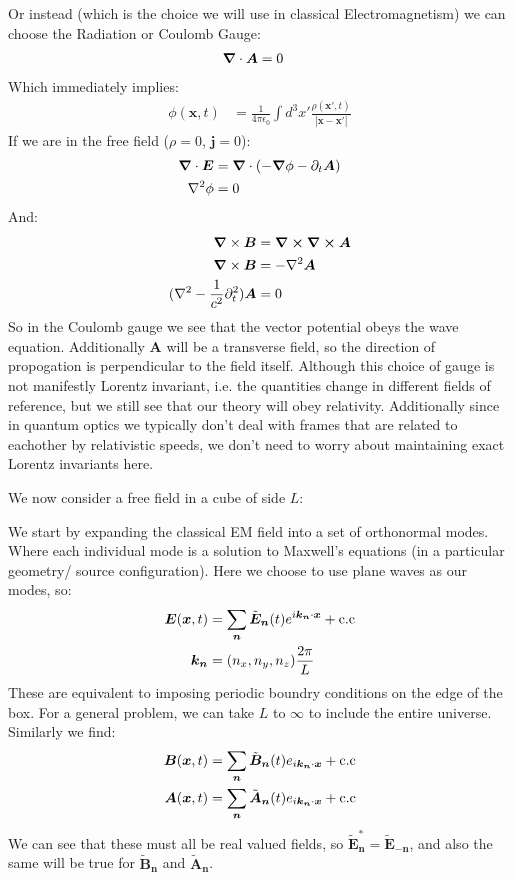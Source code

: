 Or instead (which is the choice we will use in classical Electromagnetism) we can choose the Radiation or Coulomb Gauge:
\begin{align*}
	\bm{\nabla}\cdot\bm{A} &= 0
\end{align*}
Which immediately implies:
\begin{align*}
	\phi(\bm{x},t) &= \frac{1}{4\pi\epsilon_0}\int d^3x' \frac{\rho(\bm{x}',t)}{|\bm{x} - \bm{x'}|}
\end{align*}
If we are in the free field ($\rho = 0$, $\bm{j} = 0$):
\begin{align*}
	\bm{\nabla}\cdot\bm{E} &= \bm{\nabla}\cdot(-\bm{\nabla}\phi - \partial_t\bm{A}) \\
	\nabla^2\phi &= 0
\end{align*}
And:
\begin{align*}
	\bm{\nabla}\times\bm{B} &= \bm{\nabla}\cross\bm{\nabla}\cross\bm{A} \\
	\bm{\nabla}\times\bm{B} &= -\nabla^2\bm{A} \\
	(\nabla^2 -\frac{1}{c^2}\partial_t^2)\bm{A} &= 0
\end{align*}
So in the Coulomb gauge we see that the vector potential obeys the wave equation. Additionally $\bm{A}$ will be a transverse field, so the direction of propogation is perpendicular to the field itself.
Although this choice of gauge is not manifestly Lorentz invariant, i.e. the quantities change in different fields of reference, but we still see that our theory will obey relativity.
Additionally since in quantum optics we typically don't deal with frames that are related to eachother by relativistic speeds, we don't need to worry about maintaining exact Lorentz invariants here.

We now consider a free field in a cube of side $L$:

We start by expanding the classical EM field into a set of orthonormal modes. Where each individual mode is a solution to Maxwell's equations (in a particular geometry/ source configuration).
Here we choose to use plane waves as our modes, so:
\begin{align*}
	\bm{E} (\bm{x},t) &= \sum_{\bm{n}} \tilde{\bm{E}}_{\bm{n}}(t) e^{i\bm{k}_{\bm{n}}\cdot\bm{x}} + \text{c.c} \\
	\bm{k}_{\bm{n}} &= (n_x,n_y,n_z) \frac{2\pi}{L}
\end{align*}
These are equivalent to imposing periodic boundry conditions on the edge of the box. For a general problem, we can take $L$ to $\infty$ to include the entire universe. Similarly we find:
\begin{align*}
	\bm{B}(\bm{x},t) &= \sum_{\bm{n}} \tilde{\bm{B}}_{\bm{n}}(t) e_{i\bm{k}_{\bm{n}} \cdot\bm{x}} + \text{c.c} \\
	\bm{A}(\bm{x},t) &= \sum_{\bm{n}} \tilde{\bm{A}}_{\bm{n}}(t) e_{i\bm{k}_{\bm{n}} \cdot\bm{x}} + \text{c.c}
\end{align*}
We can see that these must all be real valued fields, so $\tilde{\bm{E}}_{\bm{n}}^* = \tilde{\bm{E}}_{-\bm{n}}$, and also the same will be true for $\tilde{\bm{B}}_{\bm{n}}$ and $\tilde{\bm{A}}_{\bm{n}}$.

